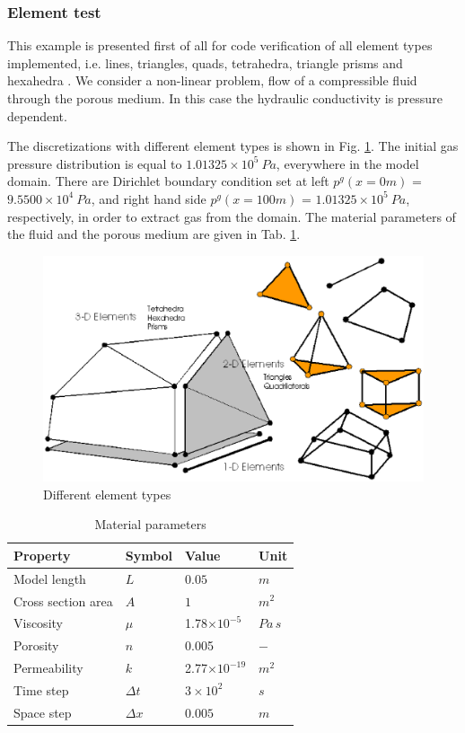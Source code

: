\subsubsection{Element test}
\label{sec:element_test}

This example is presented first of all for code verification of all
element types implemented, i.e. lines, triangles, quads,
tetrahedra, triangle prisms and hexahedra \cite{WanKol:2007}. We consider a
non-linear problem, flow of a compressible fluid through the porous
medium. In this case the hydraulic conductivity is pressure dependent.

The discretizations with different element types is shown in Fig.
\ref{fig:h_elements}. The initial gas pressure distribution is equal
to $1.01325\times10^5~Pa$, everywhere in the model domain. There are Dirichlet
boundary condition set at left $p^g(x=0m)$ = $9.5500\times10^4~Pa$, and right hand side $p^g(x=100m)$ = $1.01325\times10^5~Pa$, respectively, in order to
extract gas from the domain. The material parameters of the fluid
and the porous medium are given in Tab. \ref{tab:apl_h}.

\begin{figure}[htb!]
\center
\includegraphics[scale=0.5]{H_GAS/figures/elements.eps}
\caption{Different element types} \label{fig:h_elements}
\end{figure}

\renewcommand{\baselinestretch}{0.9}
\begin{table}[htb!]
\centering
\begin{tabular}{llll}
\hline\hline
Property  &  Symbol & Value & Unit \\
\hline
Model length & $L$ & $0.05$ & $m$\\
Cross section area & $A$ & $1$  & $m^2$ \\
\hline
Viscosity & $\mu$ & 1.78$\times 10^{-5}$ & $Pa\,s$ \\
\hline
Porosity & $n$ & 0.005 & $-$\\
Permeability & $k$ &  2.77$\times 10^{-19}$ & $m^2$ \\
\hline
Time step & $\Delta t$ & $ 3\times 10^2$ & $s$\\
Space step & $\Delta x$ & $0.005$ & $m$\\
\hline\hline
\end{tabular}
\caption{Material parameters}
\label{tab:apl_h}
\end{table}

